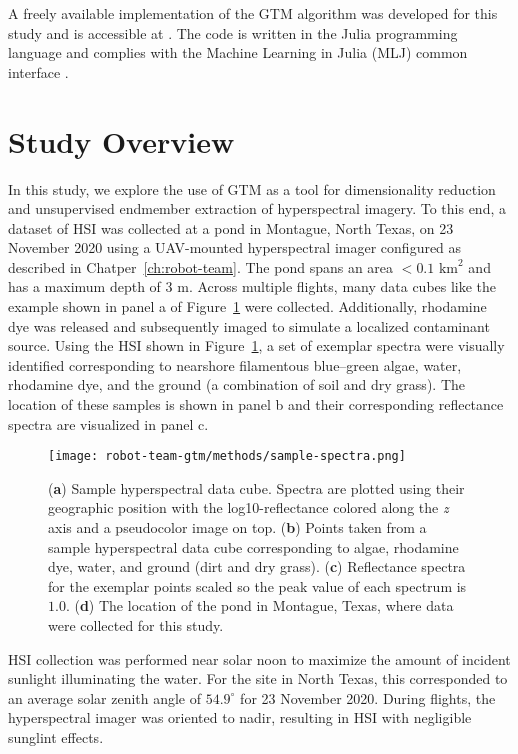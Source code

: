 A freely available implementation of the GTM algorithm was developed for this
study and is accessible at \cite{gtm-code}. The code is written in the Julia
programming language and complies with the Machine Learning in Julia (MLJ)
common interface \cite{bezanson2012julia,blaom2020mlj}.


\section{Study Overview}

In this study, we explore the use of  GTM as a tool for dimensionality reduction
and unsupervised endmember extraction of hyperspectral imagery. To this end, a
dataset of HSI was collected at a pond in Montague, North Texas, on 23 November
2020 using a UAV-mounted hyperspectral imager configured as described in
Chatper~\ref{ch:robot-team}. The pond spans an area $<0.1$ $\text{km}^2$
and has a maximum depth of $3$ m. Across multiple flights, many data cubes like
the example shown in panel a of Figure~\ref{fig:sample-spectra} were collected.
Additionally, rhodamine dye was released and subsequently imaged to simulate a
localized contaminant source. Using the HSI shown in
Figure~\ref{fig:sample-spectra}, a set of exemplar spectra were visually
identified corresponding to nearshore filamentous blue--green algae, water,
rhodamine dye, and the ground (a combination of soil and dry grass). The
location of these samples is shown in panel b and their corresponding
reflectance spectra are visualized in panel c.

\begin{figure}[!h]
  \centering
  \texttt{[image: robot-team-gtm/methods/sample-spectra.png]}
  \caption{(\textbf{a}) Sample hyperspectral data cube. Spectra are plotted
    using their geographic position with the log10-reflectance colored along the
    \emph{z} axis and a pseudocolor image on top. (\textbf{b}) Points taken from
    a sample hyperspectral data cube corresponding to algae, rhodamine dye,
    water, and ground (dirt and dry grass). (\textbf{c}) Reflectance spectra for
    the exemplar points scaled so the peak value of each spectrum is $1.0$.
    (\textbf{d}) The location of the pond in Montague, Texas, where data were
    collected for this study.}
    \label{fig:sample-spectra}
\end{figure}

HSI collection was performed near solar noon to maximize the amount of incident
sunlight illuminating the water. For the site in North Texas, this corresponded
to an average solar zenith angle of $54.9^\circ$ for 23 November 2020. During
flights, the hyperspectral imager was oriented to nadir, resulting in HSI with
negligible sunglint effects.

